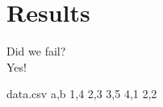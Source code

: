 \section{Results}
\label{sec:res}

Did we fail? \\
Yes!

\begin{filecontents*}{data.csv}
    a,b
    1,4
    2,3
    3,5
    4,1
    2,2
\end{filecontents*}

